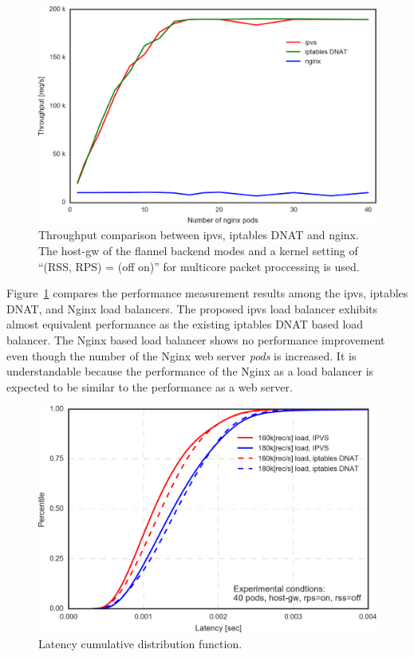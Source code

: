 \begin{figure}
  \centering
  \includegraphics[width=0.8\columnwidth]{Figs/ipvs-iptables-nginx}
  \caption{Throughput comparison between ipvs, iptables DNAT and nginx. The host-gw of the flannel backend modes and a kernel setting of \enquote{(RSS, RPS) = (off on)} for multicore packet proccessing is used. }
  \label{fig:ipvs-iptables-nginx}
\end{figure}

Figure~\ref{fig:ipvs-iptables-nginx} compares the performance measurement results among the ipvs, iptables DNAT, and Nginx load balancers.
The proposed ipvs load balancer exhibits almost equivalent performance as the existing iptables DNAT based load balancer. 
The Nginx based load balancer shows no performance improvement even though the number of the Nginx web server {\em pods} is increased.
It is understandable because the performance of the Nginx as a load balancer is expected to be similar to the performance as a web server.

\begin{figure}
  \centering
  \includegraphics[width=0.8\columnwidth]{Figs/latency_cdf_rps_40pods}
  \caption{Latency cumulative distribution function.}
  \label{fig:latency_cdf_rps_40pods}
\end{figure}

